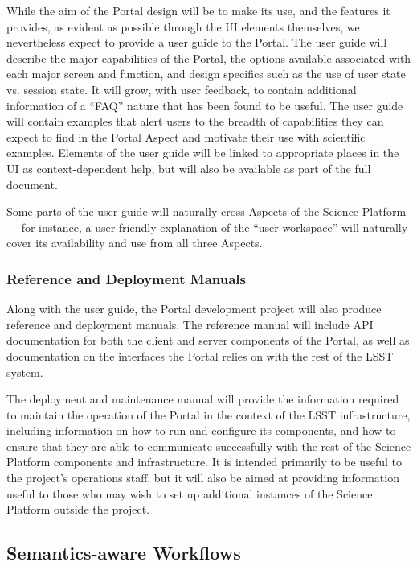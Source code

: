 While the aim of the Portal design will be to make its use, and the features it provides, as evident as possible through the UI elements themselves, we nevertheless expect to provide a user guide to the Portal.
The user guide will describe the major capabilities of the Portal, the options available associated with each major screen and function, and design specifics such as the use of user state vs. session state.
It will grow, with user feedback, to contain additional information of a ``FAQ'' nature that has been found to be useful.
The user guide will contain examples that alert users to the breadth of capabilities they can expect to find in the Portal Aspect and motivate their use with scientific examples.
Elements of the user guide will be linked to appropriate places in the UI as context-dependent help, but will also be available as part of the full document.

Some parts of the user guide will naturally cross Aspects of the Science Platform --- for instance, a user-friendly explanation of the ``user workspace'' will naturally cover its availability and use from all three Aspects.

\subsubsection{Reference and Deployment Manuals}

Along with the user guide, the Portal development project will also produce reference and deployment manuals.
The reference manual will include API documentation for both the client and server components of the Portal, as well as documentation on the interfaces the Portal relies on with the rest of the LSST system.

The deployment and maintenance manual will provide the information required to maintain the operation of the Portal in the context of the LSST infrastructure, including information on how to run and configure its components, and how to ensure that they are able to communicate successfully with the rest of the Science Platform components and infrastructure.
It is intended primarily to be useful to the project's operations staff, but it will also be aimed at providing information useful to those who may wish to set up additional instances of the Science Platform outside the project.

\subsection{Semantics-aware Workflows}\label{semantics-aware-workflows}

